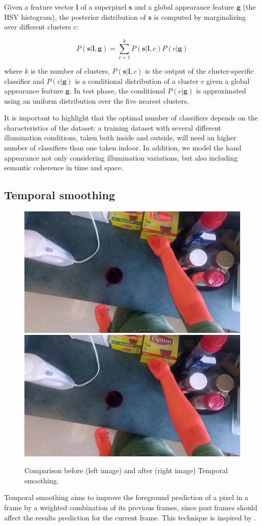 Given a feature vector $\mathbf{l}$ of a superpixel $\mathbf{s}$ and a global appearance
feature $\mathbf{g}$ (the HSV histogram), the posterior distribution of $\mathbf{s}$
is computed by marginalizing over different clusters $c$:

\begin{equation}
P(\mathbf{s}|\mathbf{l},\mathbf{g})=\sum_{c=1}^{k}P(\mathbf{s}|\mathbf{l},c)P(c|\mathbf{g})
\end{equation}


where $k$ is the number of clusters, $P(\mathbf{s}|\mathbf{l},c)$ is the output of the cluster-specific
classifier and $P(c|\mathbf{g})$ is a conditional distribution of a
cluster $c$ given a global appearance feature $\mathbf{g}$. In test
phase, the conditional $P(c|\mathbf{g})$ is approximated using an
uniform distribution over the five nearest clusters.

It is important to highlight that the optimal number of classifiers
depends on the characteristics of the dataset: a training dataset
with several different illumination conditions, taken both inside and
outside, will need an higher number of classifiers than one taken indoor.
In addition, we model the hand appearance not
only considering illumination variations, but also including semantic coherence in time and space.


\subsection{Temporal smoothing}
\begin{figure}[tb]
\centering
\includegraphics[width=.45\columnwidth]{./Figures/context-free2.jpg}
\includegraphics[width=.45\columnwidth]{./Figures/context-dependent2.jpg}
\caption{Comparison before (left image) and after (right image) Temporal smoothing.}
\label{fig:gesture_samples_time}
\end{figure}
Temporal smoothing aims to improve the foreground prediction of a pixel in a frame by a weighted combination of
its previous frames, since past frames should affect the results prediction for the current frame. This technique is inspired by \cite{liu08}.

